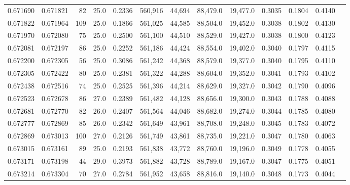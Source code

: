 \begin{tabular}{rrrrrrrrrrrrr}
0.671690 & 0.671821 &    82 & 25.0 &                                     0.2336 & 560,916 &  44,694 &  88,479.0 &  19,477.0 & 0.3035 & 0.1804 & 0.4140 \\
0.671822 & 0.671964 &   109 & 25.0 &                                     0.1866 & 561,025 &  44,585 &  88,504.0 &  19,452.0 & 0.3038 & 0.1802 & 0.4130 \\
0.671970 & 0.672080 &    75 & 25.0 &                                     0.2500 & 561,100 &  44,510 &  88,529.0 &  19,427.0 & 0.3038 & 0.1800 & 0.4123 \\
0.672081 & 0.672197 &    86 & 25.0 &                                     0.2252 & 561,186 &  44,424 &  88,554.0 &  19,402.0 & 0.3040 & 0.1797 & 0.4115 \\
0.672200 & 0.672305 &    56 & 25.0 &                                     0.3086 & 561,242 &  44,368 &  88,579.0 &  19,377.0 & 0.3040 & 0.1795 & 0.4110 \\
0.672305 & 0.672422 &    80 & 25.0 &                                     0.2381 & 561,322 &  44,288 &  88,604.0 &  19,352.0 & 0.3041 & 0.1793 & 0.4102 \\
0.672438 & 0.672516 &    74 & 25.0 &                                     0.2525 & 561,396 &  44,214 &  88,629.0 &  19,327.0 & 0.3042 & 0.1790 & 0.4096 \\
0.672523 & 0.672678 &    86 & 27.0 &                                     0.2389 & 561,482 &  44,128 &  88,656.0 &  19,300.0 & 0.3043 & 0.1788 & 0.4088 \\
0.672681 & 0.672770 &    82 & 26.0 &                                     0.2407 & 561,564 &  44,046 &  88,682.0 &  19,274.0 & 0.3044 & 0.1785 & 0.4080 \\
0.672777 & 0.672869 &    85 & 26.0 &                                     0.2342 & 561,649 &  43,961 &  88,708.0 &  19,248.0 & 0.3045 & 0.1783 & 0.4072 \\
0.672869 & 0.673013 &   100 & 27.0 &                                     0.2126 & 561,749 &  43,861 &  88,735.0 &  19,221.0 & 0.3047 & 0.1780 & 0.4063 \\
0.673015 & 0.673161 &    89 & 25.0 &                                     0.2193 & 561,838 &  43,772 &  88,760.0 &  19,196.0 & 0.3049 & 0.1778 & 0.4055 \\
0.673171 & 0.673198 &    44 & 29.0 &                                     0.3973 & 561,882 &  43,728 &  88,789.0 &  19,167.0 & 0.3047 & 0.1775 & 0.4051 \\
0.673214 & 0.673304 &    70 & 27.0 &                                     0.2784 & 561,952 &  43,658 &  88,816.0 &  19,140.0 & 0.3048 & 0.1773 & 0.4044 \\

\end{tabular}
